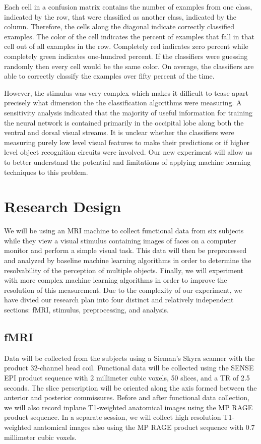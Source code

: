 \documentclass[12pt]{article}
\begin{document}
Each cell in a confusion matrix contains the number of examples from one class, indicated by the row, that were classified as another class, indicated by the column.
Therefore, the cells along the diagonal indicate correctly classified examples.
The color of the cell indicates the percent of examples that fall in that cell out of all examples in the row.
Completely red indicates zero percent while completely green indicates one-hundred percent.
If the classifiers were guessing randomly then every cell would be the same color.
On average, the classifiers are able to correctly classify the examples over fifty percent of the time.

However, the stimulus was very complex which makes it difficult to tease apart precisely what dimension the the classification algorithms were measuring.
A sensitivity analysis indicated that the majority of useful information for training the neural network is contained primarily in the occipital lobe along both the ventral and dorsal visual streams.
It is unclear whether the classifiers were measuring purely low level visual features to make their predictions or if higher level object recognition circuits were involved.
Our new experiment will allow us to better understand the potential and limitations of applying machine learning techniques to this problem.

\section{Research Design}
We will be using an MRI machine to collect functional data from six subjects while they view a visual stimulus containing images of faces on a computer monitor and perform a simple visual task.
This data will then be preprocessed and analyzed by baseline machine learning algorithms in order to determine the resolvability of the perception of multiple objects.
Finally, we will experiment with more complex machine learning algorithms in order to improve the resolution of this measurement.
Due to the complexity of our experiment, we have divied our research plan into four distinct and relatively independent sections: fMRI, stimulus, preprocessing, and analysis.

\subsection{fMRI}
Data will be collected from the subjects using a Sieman's Skyra scanner with the product 32-channel head coil.
Functional data will be collected using the SENSE EPI product sequence with 2 millimeter cubic voxels, 50 slices, and a TR of 2.5 seconds.
The slice perscription will be oriented along the axis formed between the anterior and posterior commissures.
Before and after functional data collection, we will also record inplane T1-weighted anatomical images using the MP RAGE product sequence.
In a separate session, we will collect high resolution T1-weighted anatomical images also using the MP RAGE product sequence with 0.7 millimeter cubic voxels.
\end{document}
